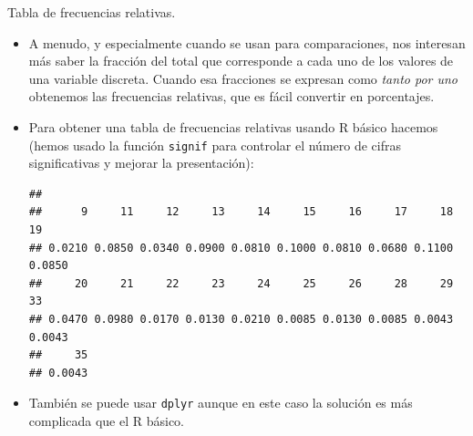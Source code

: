 \documentclass[
  9pt,
  ignorenonframetext,
]{beamer}
\newenvironment{Shaded}{\begin{snugshade}}{\end{snugshade}}
\newcommand{\CommentTok}[1]{\textcolor[rgb]{0.56,0.35,0.01}{\textit{#1}}}
\newcommand{\DataTypeTok}[1]{\textcolor[rgb]{0.13,0.29,0.53}{#1}}
\newcommand{\DecValTok}[1]{\textcolor[rgb]{0.00,0.00,0.81}{#1}}
\newcommand{\KeywordTok}[1]{\textcolor[rgb]{0.13,0.29,0.53}{\textbf{#1}}}
\newcommand{\NormalTok}[1]{#1}
\newcommand{\OperatorTok}[1]{\textcolor[rgb]{0.81,0.36,0.00}{\textbf{#1}}}
\newcommand{\OtherTok}[1]{\textcolor[rgb]{0.56,0.35,0.01}{#1}}
\newcommand{\StringTok}[1]{\textcolor[rgb]{0.31,0.60,0.02}{#1}}
\begin{document}
\begin{frame}[fragile]{Tabla de frecuencias relativas.}
\protect\hypertarget{tabla-de-frecuencias-relativas.}{}

\begin{itemize}
\item
  A menudo, y especialmente cuando se usan para comparaciones, nos
  interesan más saber la fracción del total que corresponde a cada uno
  de los valores de una variable discreta. Cuando esa fracciones se
  expresan como \emph{tanto por uno} obtenemos las frecuencias
  relativas, que es fácil convertir en porcentajes.
\item
  Para obtener una tabla de frecuencias relativas usando R básico
  hacemos (hemos usado la función \texttt{signif} para controlar el
  número de cifras significativas y mejorar la presentación): \small

\begin{Shaded}
\end{Shaded}

\begin{verbatim}
## 
##      9     11     12     13     14     15     16     17     18     19 
## 0.0210 0.0850 0.0340 0.0900 0.0810 0.1000 0.0810 0.0680 0.1100 0.0850 
##     20     21     22     23     24     25     26     28     29     33 
## 0.0470 0.0980 0.0170 0.0130 0.0210 0.0085 0.0130 0.0085 0.0043 0.0043 
##     35 
## 0.0043
\end{verbatim}
\end{itemize}

\normalsize

\begin{itemize}
\item
  También se puede usar \texttt{dplyr} aunque en este caso la solución
  es más complicada que el R básico. \small

\begin{Shaded}
\end{Shaded}
\end{itemize}

\normalsize

\end{frame}
\end{document}
